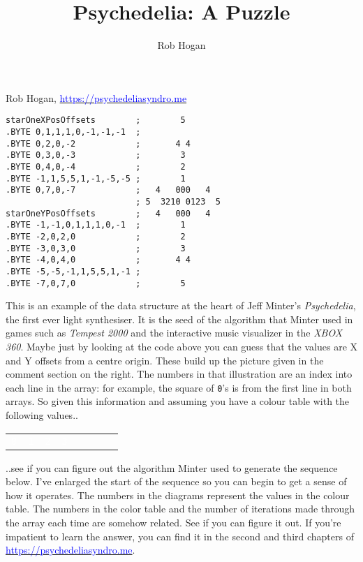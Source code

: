 \documentclass[pagedoutpaper,twocolumn,9pt]{pagedoutcustom}
\title{Psychedelia: A Puzzle}
\author{Rob Hogan}
\makeatletter
\newcommand*{\icode}[1]{{\texttt{#1}}}
\renewcommand{\maketitle}{
\begin{flushleft}
{\noindent\Huge\bf\@title}\break
\end{flushleft}
}
\makeatother
\begin{document}
    
\maketitle
\vspace{-0.8cm}
Rob Hogan, \href{https://psychedeliasyndro.me}{\textcolor{blue}{https://psychedeliasyndro.me}}
\begin{lstlisting}[basicstyle=\ttfamily\small]
starOneXPosOffsets        ;        5       
.BYTE 0,1,1,1,0,-1,-1,-1  ;                
.BYTE 0,2,0,-2            ;       4 4                                       
.BYTE 0,3,0,-3            ;        3                                        
.BYTE 0,4,0,-4            ;        2                                        
.BYTE -1,1,5,5,1,-1,-5,-5 ;        1       
.BYTE 0,7,0,-7            ;   4   000   4                                   
                          ; 5  3210 0123  5                  
starOneYPosOffsets        ;   4   000   4  
.BYTE -1,-1,0,1,1,1,0,-1  ;        1                                        
.BYTE -2,0,2,0            ;        2                                        
.BYTE -3,0,3,0            ;        3                                        
.BYTE -4,0,4,0            ;       4 4      
.BYTE -5,-5,-1,1,5,5,1,-1 ;                                                 
.BYTE -7,0,7,0            ;        5       
\end{lstlisting}   
This is an example of the data structure at the heart of Jeff Minter's \textit{Psychedelia}, the
first ever light synthesiser. It is the seed of the algorithm that Minter used in games such as
\textit{Tempest 2000} and the interactive music visualizer in the \textit{XBOX 360}. Maybe just
by looking at the code above you can guess that the values are X and Y offsets from a centre origin.
These build up the picture given in the comment section on the right. The numbers in that illustration
are an index into each line in the array: for example, the square of \icode{0}'s is from the first line in
both arrays. So given this information and assuming you have a colour table with the following values..
\begin{adjustbox}{width=5cm,center}
  \begin{tabular}{cccccccc}
    \cellcolor[HTML]{000000}\textcolor{white}{\icode{0}} & \cellcolor{c64_blue}\textcolor{white}{\icode{1}} &
    \cellcolor{c64_red}\textcolor{white}{\icode{2}} & \cellcolor{c64_purple}\textcolor{white}{\icode{3}} &
    \cellcolor{c64_green}\icode{4} & \cellcolor{c64_cyan}\icode{5} &
    \cellcolor{c64_yellow}\icode{6} & \cellcolor{c64_white}\icode{7}  \\
  \end{tabular}
\end{adjustbox}
..see if you can figure out the algorithm Minter used to generate the sequence below. I've enlarged the 
start of the sequence so you can begin to get a sense of how it operates. The numbers in the diagrams
represent the values in the colour table. The numbers in the color table and the number of iterations
made through the array each time are somehow related. See if you can figure it out.
If you're impatient to learn the answer, you can find it in the second and third chapters of 
\href{https://psychedeliasyndro.me}{\textcolor{blue}{https://psychedeliasyndro.me}}.
\end{document}
